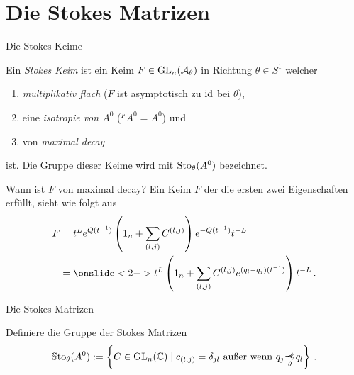 \section{Die Stokes Matrizen}
\begin{frame}[t]{Die Stokes Keime}
  \begin{defn}
    Ein \emph{Stokes Keim} ist ein Keim $F\in\operatorname{GL}_n(\mathcal{A}_\theta)$ in Richtung
    $\theta\in S^1$ welcher
    \begin{enumerate}[<+->]
    \item \emph{multiplikativ flach} ($F$ ist asymptotisch zu $\operatorname{id}$ bei $\theta$),
    \item eine \emph{isotropie von \boldmath$A^0$} (${}^FA^0=A^0$) und
    \item von \emph{maximal decay} 
    \end{enumerate}
    ist. Die Gruppe dieser Keime wird mit $\operatorname{Sto}_\theta(A^0)$ bezeichnet.
  \end{defn}
\end{frame}
\begin{frame}[t]{Wann ist $F$ von maximal decay?}
  Ein Keim $F$ der die ersten zwei Eigenschaften erfüllt, sieht wie folgt aus
  {
    \begin{align*}
      F  &=t^L e^{Q(t^{-1})}
           \left(1_n+\sum_{(l,j)}C^{(l,j)}\right)
           e^{-Q(t^{-1})}t^{-L}
      \\ &=\onslide<2->{
           t^L\left(
           1_n+\sum_{(l,j)}C^{(l,j)}e^{(q_l-q_j)(t^{-1})}
           \right)t^{-L} \,.}
    \end{align*}
  }
\end{frame}
\begin{frame}[t]{Die Stokes Matrizen}
  \begin{defn}
    Definiere die Gruppe der Stokes Matrizen
    \[
      \SSto_\theta(A^0):= \left\{
        C\in\Gl_n(\C)
        \mid
        c_{(l,j)}=\delta_{jl} \text{~außer wenn~} q_j\myrel{\theta}q_l
      \right\} \,.
    \]
  \end{defn}
\end{frame}

